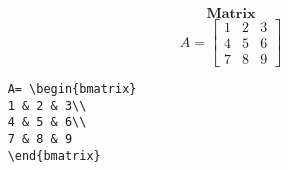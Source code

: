 \documentclass[10pt]{article}
\begin{document}
\[\textbf{Matrix} \]
\[
A= \begin{bmatrix}
1 & 2 & 3\\
4 & 5 & 6\\
7 & 8 & 9 
\end{bmatrix}
\]
\begin{verbatim}
    A= \begin{bmatrix}
    1 & 2 & 3\\
    4 & 5 & 6\\
    7 & 8 & 9 
    \end{bmatrix}
\end{verbatim}
\end{document}
